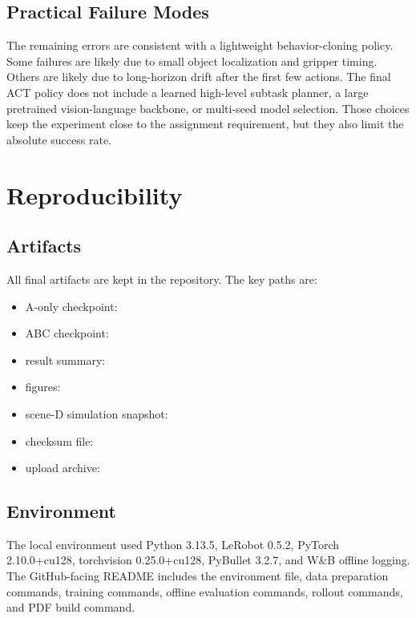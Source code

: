 \documentclass[10pt,twocolumn]{article}
\begin{document}
\subsection{Practical Failure Modes}

The remaining errors are consistent with a lightweight behavior-cloning policy. Some failures are likely due to small object localization and gripper timing. Others are likely due to long-horizon drift after the first few actions. The final ACT policy does not include a learned high-level subtask planner, a large pretrained vision-language backbone, or multi-seed model selection. Those choices keep the experiment close to the assignment requirement, but they also limit the absolute success rate.

\section{Reproducibility}

\subsection{Artifacts}

All final artifacts are kept in the repository. The key paths are:
\begin{itemize}
  \item A-only checkpoint: 
  \item ABC checkpoint: 
  \item result summary: 
  \item figures: 
  \item scene-D simulation snapshot: 
  \item checksum file: 
  \item upload archive: 
\end{itemize}

\subsection{Environment}

The local environment used Python 3.13.5, LeRobot 0.5.2, PyTorch 2.10.0+cu128, torchvision 0.25.0+cu128, PyBullet 3.2.7, and W\&B offline logging. The GitHub-facing README includes the environment file, data preparation commands, training commands, offline evaluation commands, rollout commands, and PDF build command.
\end{document}

